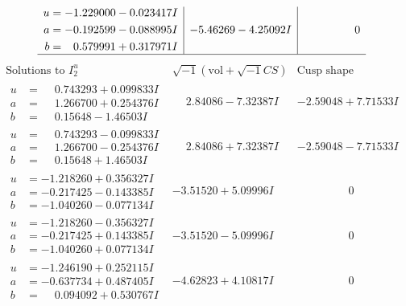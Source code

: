 \documentclass[1p]{elsarticle_modified}
\theoremstyle{definition}
\newcommand{\I}{\sqrt{-1}}
\begin{document}
$$\begin{array}{c|c|c}
\begin{aligned}
u &= -1.229000 - 0.023417 I \\
a &= -0.192599 - 0.088995 I \\
b &= \phantom{-}0.579991 + 0.317971 I\end{aligned}
 & -5.46269 - 4.25092 I & \phantom{-0.000000 } 0\\
 \hline 
 \end{array}$$\newpage$$\begin{array}{c|c|c}  
\text{Solutions to }I^u_{2}& \I (\text{vol} + \sqrt{-1}CS) & \text{Cusp shape}\\
 \hline 
\begin{aligned}
u &= \phantom{-}0.743293 + 0.099833 I \\
a &= \phantom{-}1.266700 + 0.254376 I \\
b &= \phantom{-}0.15648 - 1.46503 I\end{aligned}
 & \phantom{-}2.84086 - 7.32387 I & -2.59048 + 7.71533 I \\ \hline\begin{aligned}
u &= \phantom{-}0.743293 - 0.099833 I \\
a &= \phantom{-}1.266700 - 0.254376 I \\
b &= \phantom{-}0.15648 + 1.46503 I\end{aligned}
 & \phantom{-}2.84086 + 7.32387 I & -2.59048 - 7.71533 I \\ \hline\begin{aligned}
u &= -1.218260 + 0.356327 I \\
a &= -0.217425 - 0.143385 I \\
b &= -1.040260 - 0.077134 I\end{aligned}
 & -3.51520 + 5.09996 I & \phantom{-0.000000 } 0 \\ \hline\begin{aligned}
u &= -1.218260 - 0.356327 I \\
a &= -0.217425 + 0.143385 I \\
b &= -1.040260 + 0.077134 I\end{aligned}
 & -3.51520 - 5.09996 I & \phantom{-0.000000 } 0 \\ \hline\begin{aligned}
u &= -1.246190 + 0.252115 I \\
a &= -0.637734 + 0.487405 I \\
b &= \phantom{-}0.094092 + 0.530767 I\end{aligned}
 & -4.62823 + 4.10817 I & \phantom{-0.000000 } 0 \\ \hline\begin{aligned}

\end{aligned}
\end{array}$$
\end{document}
